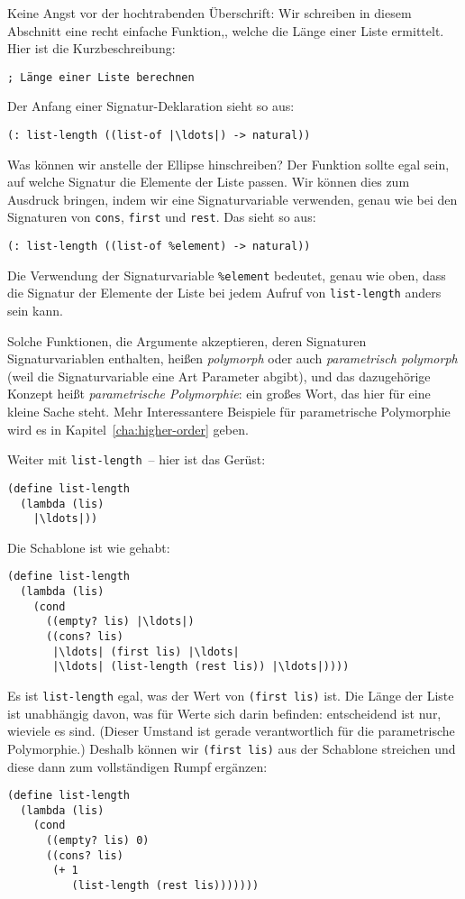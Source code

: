 Keine Angst vor der hochtrabenden Überschrift: Wir schreiben in diesem
Abschnitt eine recht einfache Funktion,, welche die Länge einer Liste
ermittelt. Hier ist die
Kurzbeschreibung:
%
\begin{lstlisting}
; Länge einer Liste berechnen
\end{lstlisting}
%
Der Anfang einer Signatur-Deklaration sieht so aus:
%
\begin{lstlisting}
(: list-length ((list-of |\ldots|) -> natural))
\end{lstlisting}
%
Was können wir anstelle der Ellipse hinschreiben?  Der Funktion sollte
egal sein, auf welche Signatur die Elemente der Liste passen. Wir
können dies zum Ausdruck bringen, indem wir eine Signaturvariable
verwenden, genau wie bei den Signaturen von \lstinline{cons},
\lstinline{first} und \lstinline{rest}.  Das sieht so aus:
%
\begin{lstlisting}
(: list-length ((list-of %element) -> natural))
\end{lstlisting}
%
Die Verwendung der Signaturvariable \lstinline{%element} bedeutet,
genau wie oben, dass die Signatur der Elemente der Liste bei jedem
Aufruf von \lstinline{list-length} anders sein kann.

Solche Funktionen, die Argumente akzeptieren, deren Signaturen
Signaturvariablen enthalten, heißen \textit{polymorph} oder auch
\textit{parametrisch polymorph} (weil die Signaturvariable eine Art
Parameter abgibt), und das dazugehörige Konzept heißt
\textit{parametrische
  Polymorphie}:
ein großes Wort, das hier für eine kleine Sache steht.  Mehr Interessantere
Beispiele für parametrische Polymorphie wird es in
Kapitel~\ref{cha:higher-order} geben.

Weiter mit \texttt{list-length}~-- hier ist das Gerüst:
%
\begin{lstlisting}
(define list-length
  (lambda (lis)
    |\ldots|))
\end{lstlisting}
%
Die Schablone ist wie gehabt:
%
\begin{lstlisting}
(define list-length
  (lambda (lis)
    (cond
      ((empty? lis) |\ldots|)
      ((cons? lis) 
       |\ldots| (first lis) |\ldots|
       |\ldots| (list-length (rest lis)) |\ldots|))))
\end{lstlisting}
%
Es ist \texttt{list-length} egal, was der Wert von \texttt{(first
  lis)} ist.  Die Länge der Liste ist unabhängig davon, was für Werte
sich darin befinden: entscheidend ist nur, wieviele es sind.  (Dieser
Umstand ist gerade verantwortlich für die parametrische Polymorphie.)
Deshalb können wir \texttt{(first lis)} aus der Schablone streichen und
diese dann zum vollständigen Rumpf ergänzen:
%
\begin{lstlisting}
(define list-length
  (lambda (lis)
    (cond
      ((empty? lis) 0)
      ((cons? lis) 
       (+ 1 
          (list-length (rest lis)))))))
\end{lstlisting}
%

